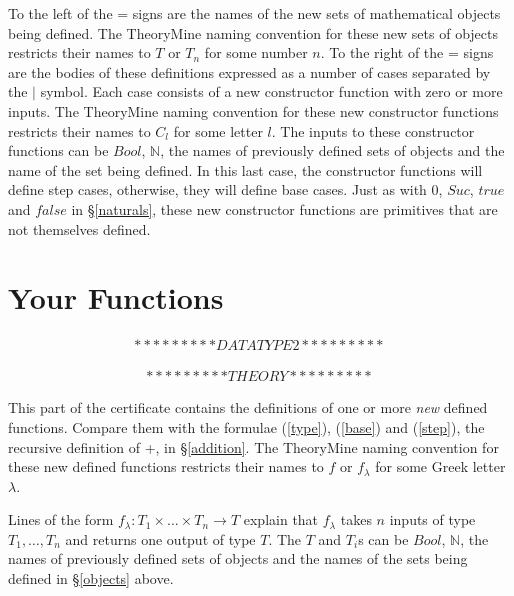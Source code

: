 \documentclass[twocolumn]{article}
\newcommand{\nat}{\mathbb{N}}
\begin{document}
To the left of the = signs are the names of the new sets of mathematical objects
being defined.  The TheoryMine naming convention for these new sets of objects
restricts their names to $T$ or $T_n$ for some number $n$. To the right of the =
signs are the bodies of these definitions expressed as a number of cases
separated by the $|$ symbol. Each case consists of a new constructor function
with zero or more inputs. The TheoryMine naming convention for these new
constructor functions restricts their names to $C_l$ for some letter $l$. The
inputs to these constructor functions can be $Bool$, $\nat$, the names of previously
defined sets of objects and the name of the set being defined. In this last
case, the constructor functions will define step cases, otherwise, they will
define base cases. Just as with $0$, $Suc$, $true$ and $false$ in
\S\ref{naturals}, these new constructor functions are primitives that are not
themselves defined.



\section{Your Functions}
\label{functions}

\begin{eqnarray*}
*********DATA TYPE2*********
\end{eqnarray*}

\begin{eqnarray*}
*********THEORY*********
\end{eqnarray*}

This part of the certificate contains the definitions of one or more {\em new}
defined functions. Compare them with the formulae (\ref{type}), (\ref{base})
and (\ref{step}), the recursive definition of +, in \S\ref{addition}. The
TheoryMine naming convention for these new defined functions restricts their
names to $f$ or $f_{\lambda}$ for some Greek letter $\lambda$.

Lines of the form $f_{\lambda} : T_1 \times \ldots \times T_n \rightarrow T$
explain that $f_{\lambda}$ takes $n$ inputs of type $T_1, \ldots, T_n$ and
returns one output of type $T$. The $T$ and $T_i$s can be $Bool$, $\nat$, the names of
previously defined sets of objects and the names of the sets being defined in
\S\ref{objects} above. 
\end{document}
